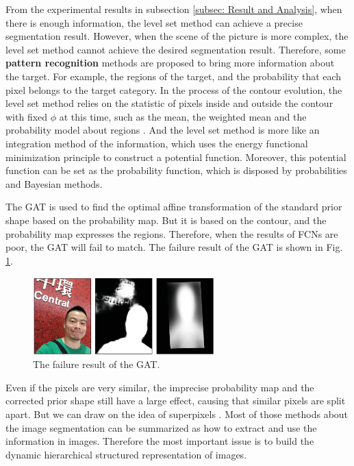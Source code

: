 From the experimental results in subsection \ref{subsec: Result and Analysis}, when there is enough information, the level set method can achieve a precise segmentation result. However, when the scene of the picture is more complex, the level set method cannot achieve the desired segmentation result. Therefore, some \textbf{pattern recognition} methods are proposed to bring more information about the target. For example, the regions of the target, and the probability that each pixel belongs to the target category. In the process of the contour evolution, the level set method relies on the statistic of pixels inside and outside the contour with fixed $\phi$ at this time, such as the mean, the weighted mean and the probability model about regions \cite{LevelSet:Discussion:lin2005probability}. And the level set method is more like an integration method of the information, which uses the energy functional minimization principle to construct a potential function. Moreover, this potential function can be set as the probability function, which is disposed by probabilities and Bayesian methods.

The GAT is used to find the optimal affine transformation of the standard prior shape based on the probability map. But it is based on the contour, and the probability map expresses the regions. Therefore, when the results of FCNs are poor, the GAT will fail to match. The failure result of the GAT is shown in Fig. \ref{fig: The failure result of the GAT}.
\begin{figure}[h]
    \centering
    \includegraphics[width=7cm]{figs/GAT_Failed.eps}
    \caption{The failure result of the GAT.}
    \label{fig: The failure result of the GAT}
\end{figure}

Even if the pixels are very similar, the imprecise probability map and the corrected prior shape still have a large effect, causing that similar pixels are split apart. But we can draw on the idea of superpixels \cite{LevelSet:superpixels:achanta2012slic}. Most of those methods about the image segmentation can be summarized as how to extract and use the information in images. Therefore the most important issue is to build the dynamic hierarchical structured representation of images.
